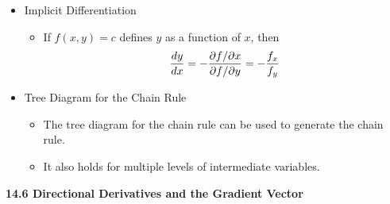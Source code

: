 \begin{itemize}
  \item Implicit Differentiation
    \begin{itemize}
    \item If $f(x,y)=c$ defines $y$ as a function of $x$, then
      \[\displaystyle\frac{dy}{dx} = -\frac{\partial f/\partial x}{\partial f/\partial y} = -\frac{f_x}{f_y}\]
    \end{itemize}

  \item Tree Diagram for the Chain Rule
    \begin{itemize}
      \item The tree diagram for the chain rule can be used to generate the chain rule.
      \item It also holds for multiple levels of intermediate variables.
    \end{itemize}
    
  

\end{itemize}

\newpage

\centerline{\bf 14.6 Directional Derivatives and the Gradient Vector}

